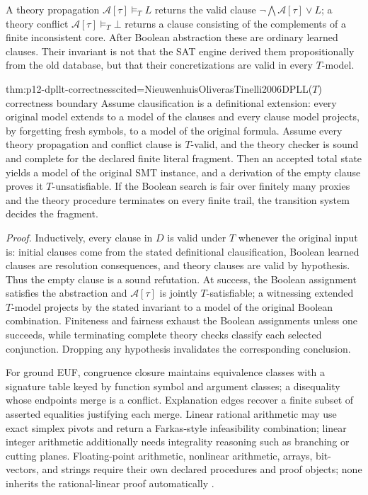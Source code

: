 A theory propagation \(\mathcal A[\tau]\models_T L\) returns the valid clause
\(\neg\bigwedge\mathcal A[\tau]\lor L\); a theory conflict
\(\mathcal A[\tau]\models_T\bot\) returns a clause consisting of the
complements of a finite inconsistent core. After Boolean abstraction these are
ordinary learned clauses. Their invariant is not that the SAT engine derived
them propositionally from the old database, but that their concretizations are
valid in every \(T\)-model.

\begin{hbtheorem}{thm:p12-dpllt-correctness}{cited=NieuwenhuisOliverasTinelli2006}{DPLL(\(T\)) correctness boundary}
Assume clausification is a definitional extension: every original model
extends to a model of the clauses and every clause model projects, by
forgetting fresh symbols, to a model of the original formula. Assume every theory propagation and
conflict clause is \(T\)-valid, and the theory checker is sound and complete for
the declared finite literal fragment. Then an accepted total state yields a
model of the original SMT instance, and a derivation of the empty clause proves
it \(T\)-unsatisfiable. If the Boolean search is fair over finitely many proxies
and the theory procedure terminates on every finite trail, the transition
system decides the fragment.
\end{hbtheorem}

\noindent\emph{Proof.}
Inductively, every clause in \(D\) is valid under \(T\) whenever the original
input is: initial clauses come from the stated definitional clausification,
Boolean learned clauses are resolution consequences, and theory clauses are
valid by hypothesis. Thus the empty clause is a sound refutation. At success,
the Boolean assignment satisfies the abstraction and \(\mathcal A[\tau]\) is
jointly \(T\)-satisfiable; a witnessing extended \(T\)-model projects by the
stated invariant to a model of the original Boolean combination. Finiteness and fairness exhaust the Boolean
assignments unless one succeeds, while terminating complete theory checks
classify each selected conjunction. Dropping any hypothesis invalidates the
corresponding conclusion.

For ground EUF, congruence closure maintains equivalence classes with a
signature table keyed by function symbol and argument classes; a disequality
whose endpoints merge is a conflict. Explanation edges recover a finite subset
of asserted equalities justifying each merge. Linear rational arithmetic may
use exact simplex pivots and return a Farkas-style infeasibility combination;
linear integer arithmetic additionally needs integrality reasoning such as
branching or cutting planes. Floating-point arithmetic, nonlinear arithmetic,
arrays, bit-vectors, and strings require their own declared procedures and
proof objects; none inherits the rational-linear proof automatically
\cite{DutertreDeMoura2006,BarrettSebastianiSeshiaTinelli2009}.

